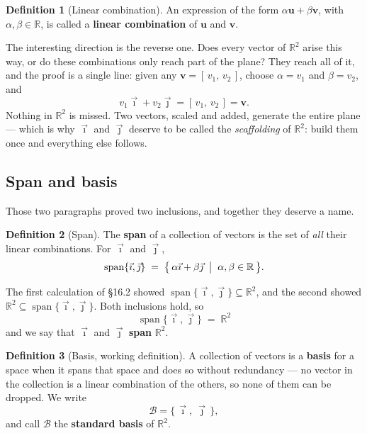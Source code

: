 \documentclass[11pt]{article}
\theoremstyle{definition}
\newtheorem{defn}{Definition}[section]
\theoremstyle{remark}
\newcommand{\R}{\mathbb{R}}
\newcommand{\vc}[1]{\mathbf{#1}}
\newcommand{\ivec}{\vec{\imath}}
\newcommand{\jvec}{\vec{\jmath}}
\newcommand{\bas}{\mathcal{B}}
\DeclareMathOperator{\spanop}{span}   %
\begin{document}
\begin{defn}[Linear combination]
An expression of the form $\alpha\vc{u}+\beta\vc{v}$, with $\alpha,\beta\in\R$,
is called a \textbf{linear combination} of $\vc{u}$ and $\vc{v}$.
\end{defn}

\noindent The interesting direction is the reverse one. Does every vector of
$\R^{2}$ arise this way, or do these combinations only reach part of the plane?
They reach all of it, and the proof is a single line: given any
$\vc{v}=[\,v_1,\,v_2\,]$, choose $\alpha=v_1$ and $\beta=v_2$, and
\[
  v_1\ivec + v_2\jvec = [\,v_1,\,v_2\,] = \vc{v} .
\]
Nothing in $\R^{2}$ is missed. Two vectors, scaled and added, generate the
entire plane --- which is why $\ivec$ and $\jvec$ deserve to be called the
\emph{scaffolding} of $\R^{2}$: build them once and everything else follows.

\subsection{Span and basis}
Those two paragraphs proved two inclusions, and together they deserve a name.

\begin{defn}[Span]
The \textbf{span} of a collection of vectors is the set of \emph{all} their
linear combinations. For $\ivec$ and $\jvec$,
\[
  \spanop\{\ivec,\jvec\}
  \;=\;
  \bigl\{\, \alpha\ivec + \beta\jvec \;\bigm|\; \alpha,\beta\in\R \,\bigr\}.
\]
\end{defn}

\noindent The first calculation of \S16.2 showed
$\spanop\{\ivec,\jvec\}\subseteq\R^{2}$, and the second showed
$\R^{2}\subseteq\spanop\{\ivec,\jvec\}$. Both inclusions hold, so
\[
  \boxed{\;\spanop\{\ivec,\jvec\} \;=\; \R^{2}\;}
\]
and we say that $\ivec$ and $\jvec$ \textbf{span} $\R^{2}$.

\begin{defn}[Basis, working definition]
A collection of vectors is a \textbf{basis} for a space when it spans that space
and does so without redundancy --- no vector in the collection is a linear
combination of the others, so none of them can be dropped. We write
\[
  \bas = \{\,\ivec,\ \jvec\,\} ,
\]
and call $\bas$ the \textbf{standard basis} of $\R^{2}$.
\end{defn}
\end{document}
